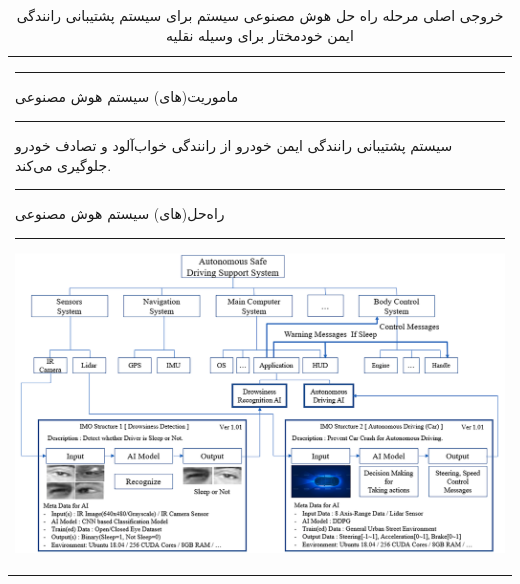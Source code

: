 \documentclass[a4paper,10pt]{article}
\begin{document}
            \begin{table}[htbp]
                
                \centering
                \caption{خروجی اصلی مرحله راه حل هوش مصنوعی سیستم برای سیستم پشتیبانی رانندگی ایمن خودمختار برای وسیله نقلیه}

                \vspace{-5pt}

                \begin{tabularx}{\textwidth}{ X }
                    
                    \hrule

                    ماموریت(های) سیستم هوش مصنوعی 

                    \vspace{3pt}
                    
                    \hrule

                    \vspace{3pt}

                    سیستم پشتیبانی رانندگی ایمن خودرو از رانندگی خواب‌آلود و تصادف خودرو جلوگیری می‌کند. 

                    \vspace{3pt}

                    \hrule

                    \vspace{3pt}

                    راه‌حل(های) سیستم هوش مصنوعی 

                    \vspace{3pt}

                    \hrule

                    \vspace{3pt}

                    \includegraphics[width=1\linewidth]{image/fig table 5.png} 


\end{tabularx}
\end{table}
\end{document}

